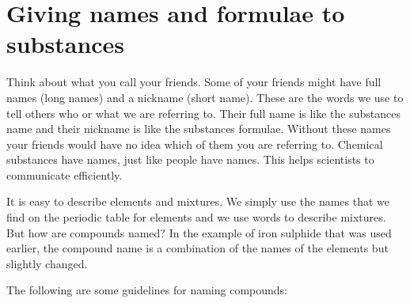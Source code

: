             \section{Giving names and formulae to substances}
            \nopagebreak
      \label{m38708*eip-379}Think about what you call your friends. Some of your friends might have full names (long names) and a nickname (short name). These are the words we use to tell others who or what we are referring to. Their full name is like the substances name and their nickname is like the substances formulae. Without these names your friends would have no idea which of them you are referring to. Chemical substances have names, just like people have names. This helps scientists to communicate efficiently.     \par \label{m38708*id64028}It is easy to describe elements and mixtures. We simply use the names that we find on the periodic table for elements and we use words to describe mixtures. But how are compounds named? In the example of iron sulphide that was used earlier, the compound name is a combination of the names of the elements but slightly changed. \par 
      \label{m38708*id64033}The following are some guidelines for naming compounds:\par 

